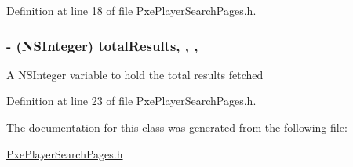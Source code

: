 Definition at line 18 of file Pxe\-Player\-Search\-Pages.\-h.

\hypertarget{interface_pxe_player_search_pages_a780f08fec4487c31591628298e7f0bcd}{
\subsubsection[{total\-Results}]{\setlength{\rightskip}{0pt plus 5cm}-\/ (N\-S\-Integer) total\-Results\hspace{0.3cm}{\ttfamily [read]}, {\ttfamily [write]}, {\ttfamily [nonatomic]}, {\ttfamily [assign]}}}\label{interface_pxe_player_search_pages_a780f08fec4487c31591628298e7f0bcd}
A N\-S\-Integer variable to hold the total results fetched 

Definition at line 23 of file Pxe\-Player\-Search\-Pages.\-h.



The documentation for this class was generated from the following file\-:\begin{DoxyCompactItemize}
\item 
\hyperlink{_pxe_player_search_pages_8h}{Pxe\-Player\-Search\-Pages.\-h}\end{DoxyCompactItemize}
